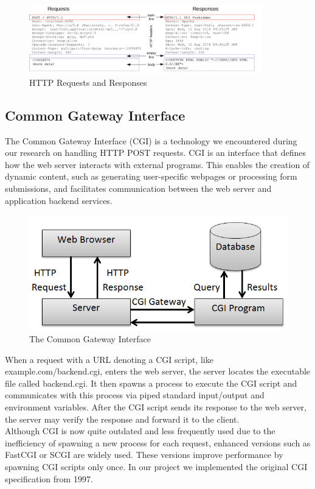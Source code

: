\begin{figure}[h]
	\centering
	\includegraphics[width=0.9\textwidth]{figures/http_structure.png}
	\caption{HTTP Requests and Responses}
\end{figure} %

\subsection*{Common Gateway Interface}
The Common Gateway Interface (CGI) is a technology we encountered during our research on handling HTTP POST requests. CGI is an interface that defines how the web server interacts with external programs. This enables the creation of dynamic content, such as generating user-specific webpages or processing form submissions, and facilitates communication between the web server and application backend services.

\begin{figure}[h]
	\centering
	\includegraphics[width=\textwidth]{figures/Common-Gateway-Interface.png}
	\caption{The Common Gateway Interface}
\end{figure}

When a request with a URL denoting a CGI script, like example.com/backend.cgi, enters the web server, the server locates the executable file called backend.cgi. It then spawns a process to execute the CGI script and communicates with this process via piped standard input/output and environment variables. After the CGI script sends its response to the web server, the server may verify the response and forward it to the client.\\

Although CGI is now quite outdated and less frequently used due to the inefficiency of spawning a new process for each request, enhanced versions such as FastCGI or SCGI are widely used. These versions improve performance by spawning CGI scripts only once. In our project we implemented the original CGI specification from 1997.

